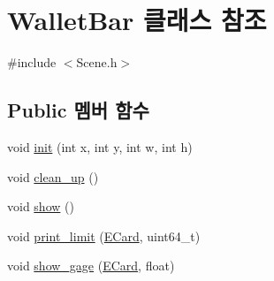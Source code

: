 \hypertarget{class_wallet_bar}{\section{\-Wallet\-Bar 클래스 참조}
\label{class_wallet_bar}
}


{\ttfamily \#include $<$\-Scene.\-h$>$}

\subsection*{\-Public 멤버 함수}
\begin{DoxyCompactItemize}
\item 
void \hyperlink{class_wallet_bar_a0e06514afd3b4f67b4b84c42f8d660b2}{init} (int x, int y, int w, int h)
\item 
void \hyperlink{class_wallet_bar_a5f41d329128d28f73a8c1c8dadae3eb7}{clean\-\_\-up} ()
\item 
void \hyperlink{class_wallet_bar_a28e4d7b035ef6ac5aff8db6b0350bc9c}{show} ()
\item 
void \hyperlink{class_wallet_bar_ade5b8ead100246a0b8da4fba1fc3ffc8}{print\-\_\-limit} (\hyperlink{_constants_8h_a03f7ec9e12b891db1bbeda07eb4099d7}{\-E\-Card}, uint64\-\_\-t)
\item 
void \hyperlink{class_wallet_bar_a9be459da1602fe0432ca83d92a20faf5}{show\-\_\-gage} (\hyperlink{_constants_8h_a03f7ec9e12b891db1bbeda07eb4099d7}{\-E\-Card}, float)
\end{DoxyCompactItemize}


